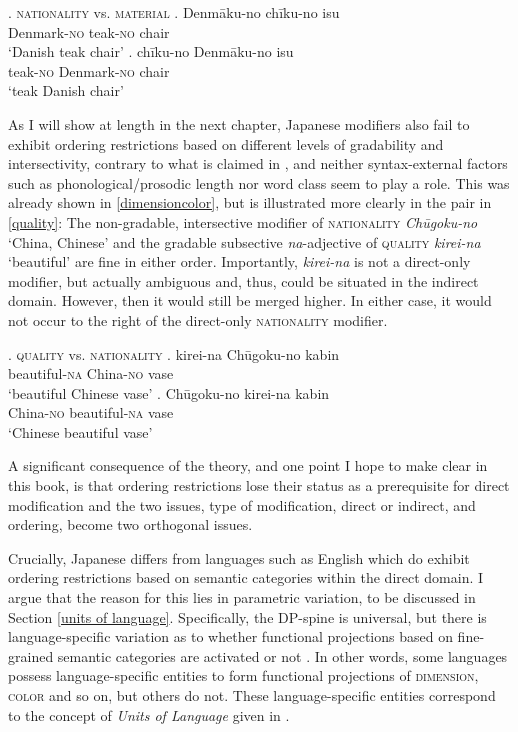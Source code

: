 \ex. \textsc{nationality} vs. \textsc{material} \label{nationality}
\ag. Denmāku-no chīku-no isu\\
Denmark-\textsc{no} teak-\textsc{no} chair\\
`Danish teak chair' \label{denmakuneu}
\bg. chīku-no Denmāku-no isu\\
teak-\textsc{no} Denmark-\textsc{no} chair\\
`teak Danish chair'

As I will show at length in the next chapter, Japanese modifiers also fail to exhibit ordering restrictions based on different levels of gradability and intersectivity, contrary to what is claimed in \citet{svenonius:2008:position, manzini:2025:left}, and neither syntax-external factors such as phonological/prosodic length nor word class seem to play a role. This was already shown in \ref{dimensioncolor}, but is illustrated more clearly in the pair in \ref{quality}: The non-gradable, intersective modifier of \textsc{nationality} \textit{Chūgoku-no} `China, Chinese' and the gradable subsective \textit{na}-adjective of \textsc{quality} \textit{kirei-na} `beautiful’ are fine in either order. Importantly, \textit{kirei-na} is not a direct-only modifier, but actually ambiguous and, thus, could be situated in the indirect domain. However, then it would still be merged higher. In either case, it would not occur to the right of the direct-only \textsc{nationality} modifier.

\ex. \textsc{quality} vs. \textsc{nationality} \label{quality}
\ag. kirei-na Chūgoku-no kabin\\
beautiful-\textsc{na} China-\textsc{no} vase\\
`beautiful Chinese vase'
\bg. Chūgoku-no kirei-na kabin\\
China-\textsc{no} beautiful-\textsc{na} vase\\
`Chinese beautiful vase'

A significant consequence of the theory, and one point I hope to make clear in this book, is that ordering restrictions lose their status as a prerequisite for direct modification and the two issues, type of modification, direct or indirect, and ordering, become two orthogonal issues.

Crucially, Japanese differs from languages such as  English which do exhibit ordering restrictions based on semantic categories within the direct domain. I argue that the reason for this lies in parametric variation, to be discussed in Section \ref{units of language}. Specifically, the DP-spine is universal, but there is language-specific variation as to whether functional projections based on fine-grained semantic categories are activated or not \citep{ramchand:2014:deriving, wiltschko:2014:universal}. In other words, some languages possess language-specific entities to form functional projections of \textsc{dimension}, \textsc{color} and so on, but others do not. These language-specific entities correspond to the concept of \textit{Units of Language} given in \citet[1]{wiltschko:2014:universal}.

